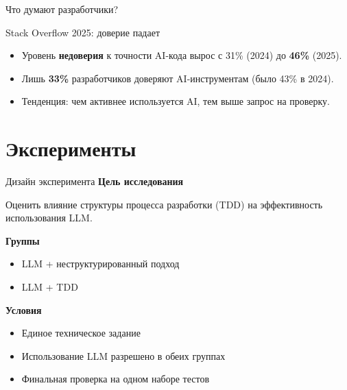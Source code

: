 \documentclass[14pt,aspectratio=169]{beamer}
\begin{document}
\begin{frame}{Что думают разработчики?}
    \begin{alertblock}{Stack Overflow 2025: доверие падает}
        \begin{itemize}
            \item Уровень \textbf{недоверия} к точности AI-кода вырос с 31\% (2024) до \textbf{46\%} (2025).
            \item Лишь \textbf{33\%} разработчиков доверяют AI-инструментам (было 43\% в 2024).
            \item Тенденция: чем активнее используется AI, тем выше запрос на проверку.
        \end{itemize}
    \end{alertblock}
    \vspace{0.3cm}
\end{frame}

\section{Эксперименты}

\begin{frame}{Дизайн эксперимента}
\textbf{Цель исследования}

Оценить влияние структуры процесса разработки (TDD) на эффективность использования LLM.

\vspace{0.5em}

\textbf{Группы}
\begin{itemize}
    \item LLM + неструктурированный подход
    \item LLM + TDD
\end{itemize}

\vspace{0.5em}

\textbf{Условия}
\begin{itemize}
    \item Единое техническое задание
    \item Использование LLM разрешено в обеих группах
    \item Финальная проверка на одном наборе тестов
\end{itemize}
\end{frame}
\end{document}
